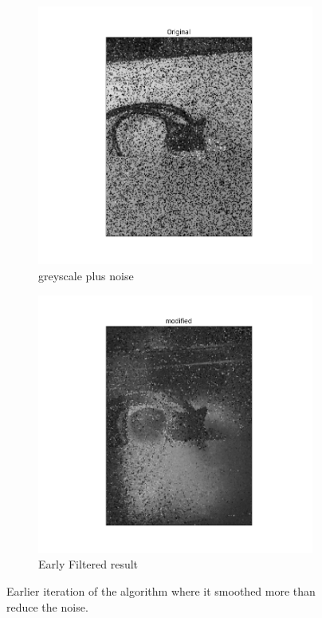 \documentclass[12pt, letterpaper]{article}
\begin{document}
\begin{figure}[H]
\begin{subfigure}[b]{.4\textwidth}
  \includegraphics[width=\textwidth]{../imgs/original_stare_nl.png}
  \caption{greyscale plus noise}
  \label{fig:4}
\end{subfigure}
\begin{subfigure}[b]{.4\textwidth}
  \centering
  \includegraphics[width=\textwidth]{../imgs/filtered_stare_nl}
  \caption{Early Filtered result}
  \label{fig:4}
\end{subfigure}
\caption{Earlier iteration of the algorithm where it smoothed more than reduce the noise.}
\end{figure}
\end{document}

